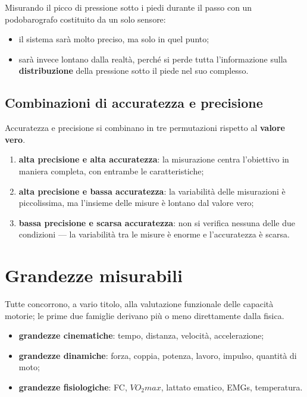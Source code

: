 Misurando il picco di pressione sotto i piedi durante il passo con un podobarografo costituito
da un solo sensore:
\begin{itemize}
  \item il sistema sarà molto preciso, ma solo in quel punto;
  \item sarà invece lontano dalla realtà, perché si perde tutta l'informazione sulla
    \textbf{distribuzione} della pressione sotto il piede nel suo complesso.
\end{itemize}

\subsection{Combinazioni di accuratezza e precisione}

Accuratezza e precisione si combinano in tre permutazioni rispetto al \textbf{valore vero}.

\begin{enumerate}
  \item[(a)] \textbf{alta precisione e alta accuratezza}: la misurazione centra l'obiettivo in
    maniera completa, con entrambe le caratteristiche;
  \item[(b)] \textbf{alta precisione e bassa accuratezza}: la variabilità delle misurazioni è
    piccolissima, ma l'insieme delle misure è lontano dal valore vero;
  \item[(c)] \textbf{bassa precisione e scarsa accuratezza}: non si verifica nessuna delle due
    condizioni --- la variabilità tra le misure è enorme e l'accuratezza è scarsa.
\end{enumerate}

\section{Grandezze misurabili}

Tutte concorrono, a vario titolo, alla valutazione funzionale delle capacità motorie; le prime due
famiglie derivano più o meno direttamente dalla fisica.

\begin{itemize}
  \item \textbf{grandezze cinematiche}: tempo, distanza, velocità, accelerazione;
  \item \textbf{grandezze dinamiche}: forza, coppia, potenza, lavoro, impulso, quantità di moto;
  \item \textbf{grandezze fisiologiche}: FC, $VO_2max$, lattato ematico, EMGs, temperatura.
\end{itemize}

